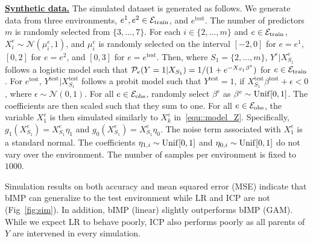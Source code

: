 \documentclass[conference,letterpaper]{IEEEtran}
\begin{document}
\noindent\underline{\bf Synthetic data.} The simulated dataset is generated as follows. We generate data from three environments, $e^1,e^2\in\mathcal{E}_{\text{train}}$, and $e^{\text{test}}$. The number of predictors $m$ is randomly selected from $\{3,\dots,7\}$. For each $i \in \{2,\dots,m\}$ and $e\in\mathcal{E}_{\text{train}}$, $X_i^e \sim \mathcal{N}(\mu^e_i,1)$, and $\mu^e_i$ is randomly selected on the interval $[-2,0]$ for $e=e^1$,  $[0,2]$ for $e=e^2$, and $[0,3]$ for $e=e^{\text{test}}$. Then, where $S_1 = \{2,\dots,m\}$, $Y^e|X_{S_1}^e$ follows a logistic model such that $\mathcal{P}_e(Y = 1 | X_{S_1}) = 1/(1+e^{-X_{S_1}\beta^e})$ for $e\in\mathcal{E}_{\text{train}}$. For $e^{\text{test}}$, $Y^{\text{test}}|X_{S_1}^{\text{test}}$ follows a probit model such that $Y^{\text{test}}=1$, if $X_{S_1}^{\text{test}}\beta^{\text{test}} + \epsilon < 0$, where $\epsilon\sim\mathcal{N}(0,1)$. For all $e\in\mathcal{E}_{\text{obs}}$, randomly select $\beta^e$ as $\beta^e\sim \mathrm{Unif}[0,1]$. The coefficients are then scaled such that they sum to one. For all $e\in\mathcal{E}_{\text{obs}}$, the variable $X_1^e$ is then simulated similarly to $X_k^e$ in~\eqref{equ::model_Z}. Specifically, $g_1(X_{S_1}^e) = X_{S_1}^e\eta_1$ and $g_0(X_{S_1}^e) = X_{S_1}^e\eta_0$. The noise term associated with $X_1^e$ is a standard normal. The coefficients $\eta_{1,i}\sim \mathrm{Unif}[0,1]$ and $\eta_{0,i}\sim \mathrm{Unif}[0,1]$ do not vary over the environment. The number of samples per environment is fixed to $1000$. 


Simulation results on both accuracy and mean squared error (MSE) indicate that \textsf{bIMP} can generalize to the test environment while \textsf{LR} and \textsf{ICP} are not (Fig~\ref{fig:sim}). In addition, \textsf{bIMP} (linear) slightly outperforms \textsf{bIMP} (GAM). While we expect \textsf{LR} to behave poorly, \textsf{ICP} also performs poorly as all parents of $Y$ are intervened in every simulation. 
\end{document}
